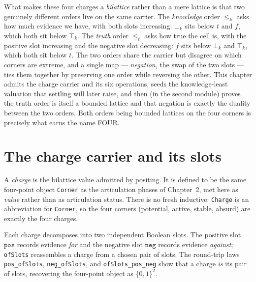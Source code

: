What makes these four charges a \emph{bilattice} rather than a mere lattice is that two genuinely different orders live on the same carrier. The \emph{knowledge} order $\le_k$ asks how much evidence we have, with both slots increasing: $\bot_k$ sits below $t$ and $f$, which both sit below $\top_k$. The \emph{truth} order $\le_t$ asks how true the cell is, with the positive slot increasing and the negative slot decreasing: $f$ sits below $\bot_k$ and $\top_k$, which both sit below $t$. The two orders share the carrier but disagree on which corners are extreme, and a single map --- \emph{negation}, the swap of the two slots --- ties them together by preserving one order while reversing the other. This chapter admits the charge carrier and its six operations, seeds the knowledge-least valuation that settling will later raise, and then (in the second module) proves the truth order is itself a bounded lattice and that negation is exactly the duality between the two orders. Both orders being bounded lattices on the four corners is precisely what earns the name FOUR.

\section{The charge carrier and its slots}

\begin{definition}[Charge]\label{def:charge}\leanok{}
  A \emph{charge} is the bilattice value admitted by positing. It is defined to be the same four-point object \texttt{Corner} as the articulation phases of Chapter~2, met here as \emph{value} rather than as articulation status. There is no fresh inductive: \texttt{Charge} is an abbreviation for \texttt{Corner}, so the four corners (potential, active, stable, absurd) are exactly the four charges.
\end{definition}

\begin{definition}\label{def:charge-slots}\leanok{}
  Each charge decomposes into two independent Boolean slots. The positive slot $\texttt{pos}$ records evidence \emph{for} and the negative slot $\texttt{neg}$ records evidence \emph{against}; \texttt{ofSlots} reassembles a charge from a chosen pair of slots. The round-trip laws \texttt{pos\_ofSlots}, \texttt{neg\_ofSlots}, and \texttt{ofSlots\_pos\_neg} show that a charge \emph{is} its pair of slots, recovering the four-point object as $\{0,1\}^2$.
\end{definition}


